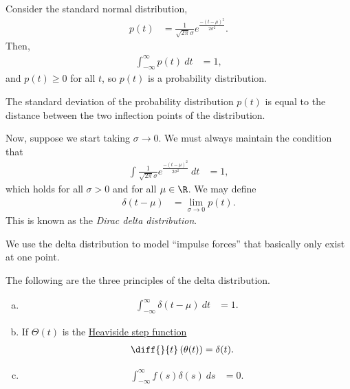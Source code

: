 \documentclass[10pt]{mypackage}
\begin{document}
\begin{example}
  Consider the standard normal distribution,
  \begin{align*}
    p(t) &= \frac{1}{\sqrt{2\pi}\sigma} e^{\frac{-\left( t-\mu \right)^2}{2\sigma^2}}.
  \end{align*}
  Then,
  \begin{align*}
    \int_{-\infty}^{\infty} p(t)\:dt &= 1,
  \end{align*}
  and $p(t) \geq 0$ for all $t$, so $p(t)$ is a probability distribution.\newline

  The standard deviation of the probability distribution $p(t)$ is equal to the distance between the two inflection points of the distribution.\newline

  Now, suppose we start taking $\sigma\rightarrow 0$. We must always maintain the condition that
  \begin{align*}
    \int_{}^{} \frac{1}{\sqrt{2\pi}\sigma}e^{\frac{-\left( t-\mu \right)^2}{2\sigma^2}}\:dt &= 1,
  \end{align*}
  which holds for all $\sigma > 0$ and for all $\mu\in\R$. We may define
  \begin{align*}
    \delta\left( t-\mu \right) &= \lim_{\sigma\rightarrow 0} p(t).
  \end{align*}
  This is known as the \textit{Dirac delta distribution}.\newline

  We use the delta distribution to model ``impulse forces'' that basically only exist at one point.
\end{example}
\begin{definition}
  The following are the three principles of the delta distribution.
  \begin{enumerate}[(a)]
    \item 
      \begin{align*}
        \int_{-\infty}^{\infty} \delta\left( t-\mu \right)\:dt &=1.
      \end{align*}
    \item If $\Theta(t)$ is the \href{https://en.wikipedia.org/wiki/Heaviside_step_function}{Heaviside step function}
      \begin{align*}
        \diff{}{t}\left( \theta(t) \right) &= \delta(t).
      \end{align*}
    \item 
      \begin{align*}
        \int_{-\infty}^{\infty} f(s)\delta(s)\:ds &= 0.
      \end{align*}
  \end{enumerate}
\end{definition}
\end{document}

